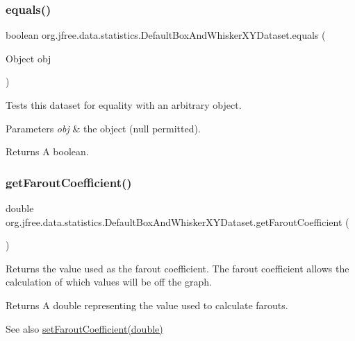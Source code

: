 \subsubsection{\texorpdfstring{equals()}{equals()}}
{\footnotesize\ttfamily boolean org.\+jfree.\+data.\+statistics.\+Default\+Box\+And\+Whisker\+X\+Y\+Dataset.\+equals (\begin{DoxyParamCaption}\item[{Object}]{obj }\end{DoxyParamCaption})}

Tests this dataset for equality with an arbitrary object.


\begin{DoxyParams}{Parameters}
{\em obj} & the object ({\ttfamily null} permitted).\\
\hline
\end{DoxyParams}
\begin{DoxyReturn}{Returns}
A boolean. 
\end{DoxyReturn}
\mbox{\label{classorg_1_1jfree_1_1data_1_1statistics_1_1_default_box_and_whisker_x_y_dataset_a0e7767b34470a4bb8b74de4c3646e1a9}} 
\subsubsection{\texorpdfstring{get\+Farout\+Coefficient()}{getFaroutCoefficient()}}
{\footnotesize\ttfamily double org.\+jfree.\+data.\+statistics.\+Default\+Box\+And\+Whisker\+X\+Y\+Dataset.\+get\+Farout\+Coefficient (\begin{DoxyParamCaption}{ }\end{DoxyParamCaption})}

Returns the value used as the farout coefficient. The farout coefficient allows the calculation of which values will be off the graph.

\begin{DoxyReturn}{Returns}
A {\ttfamily double} representing the value used to calculate farouts.
\end{DoxyReturn}
\begin{DoxySeeAlso}{See also}
\mbox{\hyperlink{classorg_1_1jfree_1_1data_1_1statistics_1_1_default_box_and_whisker_x_y_dataset_ad09efbf58cbebab01356d33631e5f578}{set\+Farout\+Coefficient(double)}} 
\end{DoxySeeAlso}


